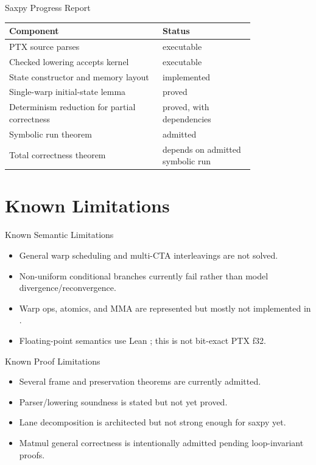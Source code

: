 \documentclass[aspectratio=169,10pt]{beamer}
\newcommand{\lean}[1]{\texttt{\detokenize{#1}}}
\newcommand{\statusproved}{\textcolor{leangreen}{proved}}
\newcommand{\statusexec}{\textcolor{leanblue}{executable}}
\newcommand{\statusadmit}{\textcolor{leanred}{admitted}}
\begin{document}
\begin{frame}{Saxpy Progress Report}
  \begin{tabular}{p{0.50\linewidth}p{0.30\linewidth}}
    \toprule
    Component & Status \\
    \midrule
    PTX source parses & \statusexec \\
    Checked lowering accepts kernel & \statusexec \\
    State constructor and memory layout & implemented \\
    Single-warp initial-state lemma & \statusproved \\
    Determinism reduction for partial correctness & \statusproved, with dependencies \\
    Symbolic run theorem & \statusadmit \\
    Total correctness theorem & depends on admitted symbolic run \\
    \bottomrule
  \end{tabular}
\end{frame}

\section{Known Limitations}

\begin{frame}{Known Semantic Limitations}
  \begin{itemize}
    \item General warp scheduling and multi-CTA interleavings are not solved.
    \item Non-uniform conditional branches currently fail rather than model divergence/reconvergence.
    \item Warp ops, atomics, and MMA are represented but mostly not implemented in \lean{stepInstr?}.
    \item Floating-point semantics use Lean \lean{Float}; this is not bit-exact PTX f32.
  \end{itemize}
\end{frame}

\begin{frame}{Known Proof Limitations}
  \begin{itemize}
    \item Several frame and preservation theorems are currently admitted.
    \item Parser/lowering soundness is stated but not yet proved.
    \item Lane decomposition is architected but not strong enough for saxpy yet.
    \item Matmul general correctness is intentionally admitted pending loop-invariant proofs.
  \end{itemize}
\end{frame}
\end{document}
